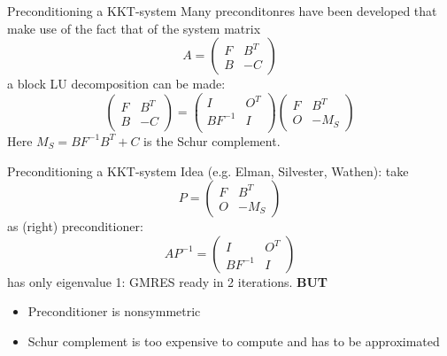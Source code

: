 \begin{frame}{Preconditioning a KKT-system}
  Many preconditonres have been developed that make use of the
  fact that of the system matrix
  \begin{equation*}
    A=
    \begin{pmatrix}
      F & B^T\\
      B & -C
    \end{pmatrix}

  \end{equation*}
  a block LU decomposition can be made:
  \begin{equation*}
    \begin{pmatrix}
F & B^T\\
B & -C
\end{pmatrix} =
\begin{pmatrix}
I& O^T\\
BF^{-1} & I\\
\end{pmatrix}
\begin{pmatrix}
F & B^T\\
O & -M_S
\end{pmatrix}
  \end{equation*}
Here $M_S = BF^{-1}B^T + C$ is the Schur complement.
\end{frame}

\begin{frame}{Preconditioning a KKT-system}
  Idea (e.g. Elman, Silvester, Wathen): take
  \begin{equation*}
    P =
    \begin{pmatrix}
F & B^T\\
O &-M_S
    \end{pmatrix}
  \end{equation*}
  as (right) preconditioner:
  \begin{equation*}
    AP^{-1} =
    \begin{pmatrix}
I & O^T\\
BF^{-1} & I
    \end{pmatrix}
  \end{equation*}
  has only eigenvalue 1: GMRES ready in 2 iterations. \textbf{BUT}
  \begin{itemize}
  \item  Preconditioner is nonsymmetric
\item Schur complement is too expensive to compute and has to
be approximated

  \end{itemize}
\end{frame}

